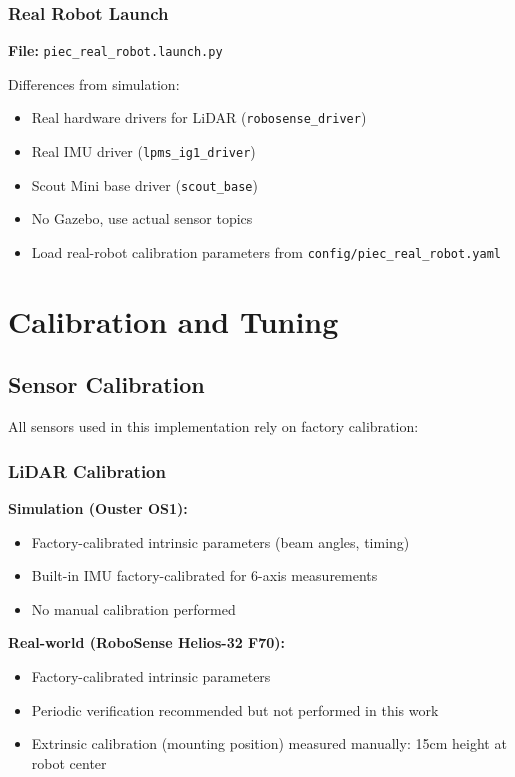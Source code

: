 \subsubsection{Real Robot Launch}

\textbf{File:} \texttt{piec\_real\_robot.launch.py}

Differences from simulation:
\begin{itemize}
    \item Real hardware drivers for LiDAR (\texttt{robosense\_driver})
    \item Real IMU driver (\texttt{lpms\_ig1\_driver})
    \item Scout Mini base driver (\texttt{scout\_base})
    \item No Gazebo, use actual sensor topics
    \item Load real-robot calibration parameters from \texttt{config/piec\_real\_robot.yaml}
\end{itemize}

\section{Calibration and Tuning}
\label{sec:impl_calibration}

\subsection{Sensor Calibration}

All sensors used in this implementation rely on factory calibration:

\subsubsection{LiDAR Calibration}

\textbf{Simulation (Ouster OS1):}
\begin{itemize}
    \item Factory-calibrated intrinsic parameters (beam angles, timing)
    \item Built-in IMU factory-calibrated for 6-axis measurements
    \item No manual calibration performed
\end{itemize}

\textbf{Real-world (RoboSense Helios-32 F70):}
\begin{itemize}
    \item Factory-calibrated intrinsic parameters
    \item Periodic verification recommended but not performed in this work
    \item Extrinsic calibration (mounting position) measured manually: 15cm height at robot center
\end{itemize}

